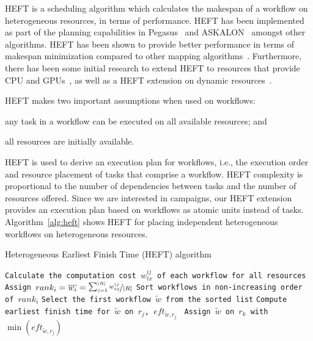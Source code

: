HEFT is a scheduling algorithm which calculates the makespan of a workflow on heterogeneous resources, in terms of performance.
HEFT has been implemented as part of the planning capabilities in Pegasus~\cite{deelman2015pegasus} and ASKALON~\cite{fahringer2005askalon} amongst other algorithms.
HEFT has been shown to provide better performance in terms of makespan minimization compared to other mapping algorithms~\cite{topcuoglu2002performance,fahringer2005askalon,canon2008comparative}. 
Furthermore, there has been some initial research to extend HEFT to resources that provide CPU and GPUs~\cite{shetti2013optimization}, as well as a HEFT extension on dynamic resources~\cite{dong2007pfas}. 

HEFT makes two important assumptions when used on workflows: 
\begin{inparaenum}[(1)] 
    \item any task in a workflow can be executed on all available resources; and 
    \item all resources are initially available.
\end{inparaenum}
HEFT is used to derive an execution plan for workflows, i.e., the execution order and resource placement of tasks that comprise a workflow.
HEFT complexity is proportional to the number of dependencies between tasks and the number of resources offered. 
Since we are interested in campaigns, our HEFT extension provides an execution plan based on workflows as atomic units instead of tasks.
Algorithm~\ref{alg:heft} shows HEFT for placing independent heterogeneous workflows on heterogeneous resources.

\begin{algorithm}[ht]
    \caption{Heterogeneous Earliest Finish Time (HEFT) algorithm}
    \label{alg:heft}
    \begin{algorithmic}[1]
        \State \texttt{Calculate the computation cost $w_{tx}^{ij}$ of each workflow for all resources}
        \State \texttt{Assign $rank_i = \overline{w_{i}} = \nicefrac{\sum_{j=1}^{|R|}w_{tx}^{ij}}{|R|}$}
        \State \texttt{Sort workflows in non-increasing order of $rank_i$}
        \State \texttt{Select the first workflow $\tilde{w}$ from the sorted list}
        \State\texttt{Compute earliest finish time for $\tilde{w}$ on $r_{j}$, $eft_{\tilde{w},r_j}$ }
        \EndFor
        \State \texttt{Assign  $\tilde{w}$ on $r_k$ with $\min{(eft_{\tilde{w},r_j})}$}
        \EndWhile
        \EndProcedure
    \end{algorithmic}
\end{algorithm}

